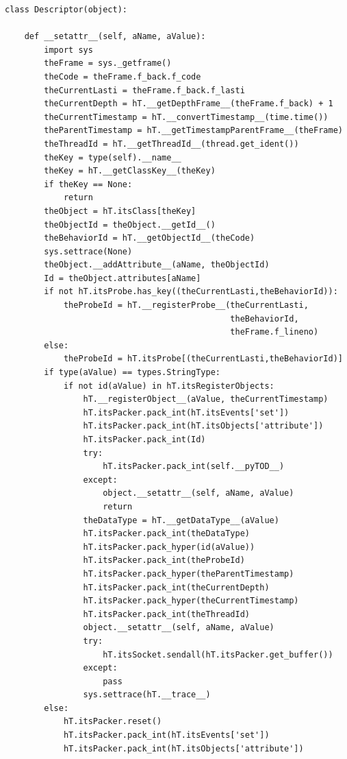 \documentclass[12pt,legalpaper]{report}
\begin{document}
\begin{singlespace}
\begin{lstlisting}[style=Python]
class Descriptor(object):

    def __setattr__(self, aName, aValue):
        import sys
        theFrame = sys._getframe()
        theCode = theFrame.f_back.f_code
        theCurrentLasti = theFrame.f_back.f_lasti
        theCurrentDepth = hT.__getDepthFrame__(theFrame.f_back) + 1
        theCurrentTimestamp = hT.__convertTimestamp__(time.time()) 
        theParentTimestamp = hT.__getTimestampParentFrame__(theFrame)
        theThreadId = hT.__getThreadId__(thread.get_ident())
        theKey = type(self).__name__
        theKey = hT.__getClassKey__(theKey)
        if theKey == None:
            return
        theObject = hT.itsClass[theKey] 
        theObjectId = theObject.__getId__()
        theBehaviorId = hT.__getObjectId__(theCode)
        sys.settrace(None)
        theObject.__addAttribute__(aName, theObjectId)
        Id = theObject.attributes[aName]
        if not hT.itsProbe.has_key((theCurrentLasti,theBehaviorId)):
            theProbeId = hT.__registerProbe__(theCurrentLasti,
                                              theBehaviorId,
                                              theFrame.f_lineno)
        else:
            theProbeId = hT.itsProbe[(theCurrentLasti,theBehaviorId)]          
        if type(aValue) == types.StringType:
            if not id(aValue) in hT.itsRegisterObjects:
                hT.__registerObject__(aValue, theCurrentTimestamp)
                hT.itsPacker.pack_int(hT.itsEvents['set'])
                hT.itsPacker.pack_int(hT.itsObjects['attribute'])
                hT.itsPacker.pack_int(Id)
                try:
                    hT.itsPacker.pack_int(self.__pyTOD__)
                except:
                    object.__setattr__(self, aName, aValue)
                    return
                theDataType = hT.__getDataType__(aValue)
                hT.itsPacker.pack_int(theDataType)
                hT.itsPacker.pack_hyper(id(aValue))
                hT.itsPacker.pack_int(theProbeId)
                hT.itsPacker.pack_hyper(theParentTimestamp)        
                hT.itsPacker.pack_int(theCurrentDepth)
                hT.itsPacker.pack_hyper(theCurrentTimestamp)
                hT.itsPacker.pack_int(theThreadId)
                object.__setattr__(self, aName, aValue)
                try:
                    hT.itsSocket.sendall(hT.itsPacker.get_buffer())
                except:
                    pass   
                sys.settrace(hT.__trace__)
        else:
            hT.itsPacker.reset()
            hT.itsPacker.pack_int(hT.itsEvents['set'])
            hT.itsPacker.pack_int(hT.itsObjects['attribute'])

\end{lstlisting}
\end{singlespace}
\end{document}
